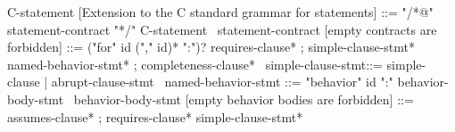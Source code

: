 \begin{syntax}
  C-statement [Extension to the C  standard grammar for statements] ::= "/*@" statement-contract "*/" C-statement
  \
  statement-contract [empty contracts are forbidden] ::= ("for" id ("," id)* ":")? requires-clause* ;
    simple-clause-stmt* named-behavior-stmt* ;
    completeness-clause*
  \
  simple-clause-stmt::= simple-clause | abrupt-clause-stmt
  \
  named-behavior-stmt ::= "behavior" id ":" behavior-body-stmt
  \
  behavior-body-stmt [empty behavior bodies are forbidden] ::= assumes-clause* ;
       requires-clause* simple-clause-stmt*
\end{syntax}
